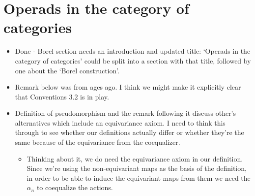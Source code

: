 \documentclass{amsart}
\begin{document}
\section{Operads in the category of categories}
\begin{itemize}
\item Done - Borel section needs an introduction and updated title: `Operads in the category of categories' could be split into a section with that title, followed by one about the `Borel construction'.
\item Remark below was from ages ago. I think we might make it explicitly clear that Conventions 3.2 is in play.
\item Definition of pseudomorphism and the remark following it discuss other's alternatives which include an equivariance axiom. I need to think this through to see whether our definitions actually differ or whether they're the same because of the equivariance from the coequalizer.
	\begin{itemize}
		\item Thinking about it, we do need the equivariance axiom in our definition. Since we're using the non-equivariant maps as the basis of the definition, in order to be able to induce the equivariant maps from them we need the $\alpha_n$ to coequalize the actions.
	\end{itemize}
\end{itemize}
\end{document}
